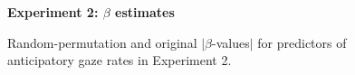 \documentclass[authoryear, 12pt]{elsarticle}
\begin{document}
\begin{figure}
  \centering
  \textbf{Experiment 2: \textit{$\beta$} estimates}\par\medskip
  \hfill
  \caption{Random-permutation and original $|$\textit{$\beta$}-values$|$ for predictors of anticipatory gaze rates in Experiment 2.}
\label{fig:E2-Bs}
\end{figure}
\end{document}
